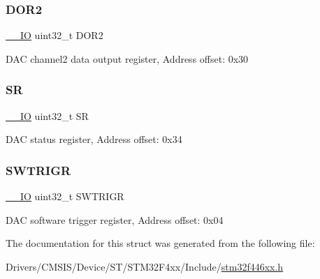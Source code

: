 \subsubsection{\texorpdfstring{D\+O\+R2}{DOR2}}
{\footnotesize\ttfamily \mbox{\hyperlink{core__sc300_8h_aec43007d9998a0a0e01faede4133d6be}{\+\_\+\+\_\+\+IO}} uint32\+\_\+t D\+O\+R2}

D\+AC channel2 data output register, Address offset\+: 0x30 \mbox{\label{struct_d_a_c___type_def_af6aca2bbd40c0fb6df7c3aebe224a360}} 
\subsubsection{\texorpdfstring{SR}{SR}}
{\footnotesize\ttfamily \mbox{\hyperlink{core__sc300_8h_aec43007d9998a0a0e01faede4133d6be}{\+\_\+\+\_\+\+IO}} uint32\+\_\+t SR}

D\+AC status register, Address offset\+: 0x34 \mbox{\label{struct_d_a_c___type_def_a896bbb7153af0b67ad772360feaceeb4}} 
\subsubsection{\texorpdfstring{S\+W\+T\+R\+I\+GR}{SWTRIGR}}
{\footnotesize\ttfamily \mbox{\hyperlink{core__sc300_8h_aec43007d9998a0a0e01faede4133d6be}{\+\_\+\+\_\+\+IO}} uint32\+\_\+t S\+W\+T\+R\+I\+GR}

D\+AC software trigger register, Address offset\+: 0x04 

The documentation for this struct was generated from the following file\+:\begin{DoxyCompactItemize}
\item 
Drivers/\+C\+M\+S\+I\+S/\+Device/\+S\+T/\+S\+T\+M32\+F4xx/\+Include/\mbox{\hyperlink{stm32f446xx_8h}{stm32f446xx.\+h}}\end{DoxyCompactItemize}
